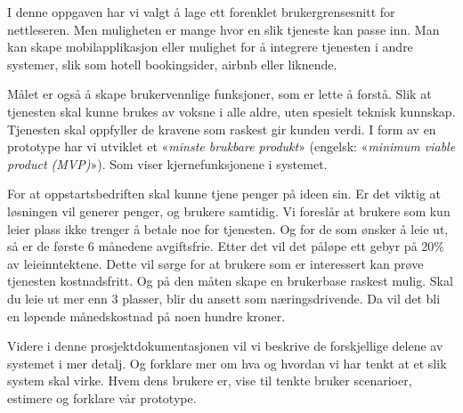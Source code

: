 I denne oppgaven har vi valgt å lage ett forenklet brukergrensesnitt for nettleseren. Men muligheten er mange hvor en slik tjeneste kan passe inn.  Man kan skape mobilapplikasjon eller mulighet for å integrere tjenesten i andre systemer, slik som hotell bookingsider, airbnb eller liknende.

Målet er også å skape brukervennlige funksjoner, som er lette å forstå. Slik at tjenesten skal kunne brukes av voksne i alle aldre, uten spesielt teknisk kunnskap.  Tjenesten skal oppfyller de kravene som raskest gir kunden verdi. I form av en prototype har vi utviklet et «\textit{minste brukbare produkt}» (engelsk: «\textit{minimum viable product (MVP)}»). Som viser kjernefunksjonene i systemet.



For at oppstartsbedriften skal kunne tjene penger på ideen sin. Er det viktig at løsningen vil generer penger, og brukere samtidig. Vi foreslår at brukere som kun leier plass ikke trenger å betale noe for tjenesten. Og for de som ønsker å leie ut, så er de første 6 månedene avgiftsfrie. Etter det vil det påløpe ett gebyr på 20\% av leieinntektene. Dette vil sørge for at brukere som er interessert kan prøve tjenesten kostnadsfritt. Og på den måten skape en brukerbase raskest mulig. Skal du leie ut mer enn 3 plasser, blir du ansett som næringsdrivende. Da vil det bli en løpende månedskostnad på noen hundre kroner.


Videre i denne prosjektdokumentasjonen vil vi beskrive de forskjellige delene av systemet i mer detalj. Og forklare mer om hva og hvordan vi har tenkt at et slik system skal virke. Hvem dens brukere er, vise til tenkte bruker scenarioer, estimere og forklare vår prototype.




